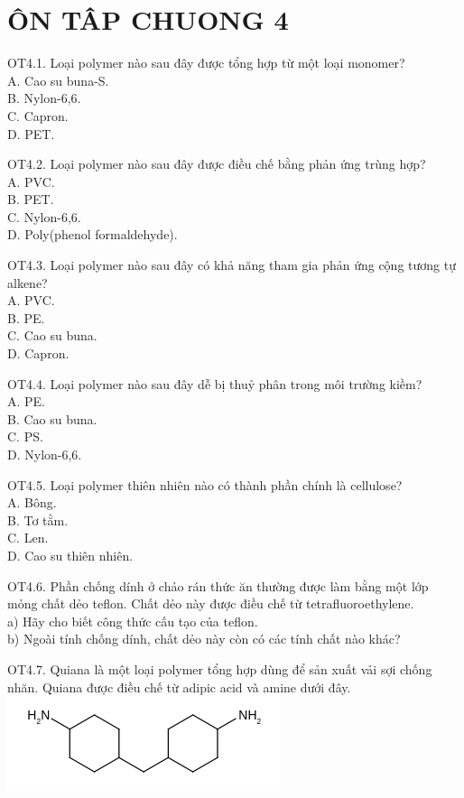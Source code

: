 \documentclass[10pt]{article}
\begin{document}
\section*{ÔN TÂP CHUONG 4}
OT4.1. Loại polymer nào sau đây được tổng hợp từ một loại monomer?\\
A. Cao su buna-S.\\
B. Nylon-6,6.\\
C. Capron.\\
D. PET.

OT4.2. Loại polymer nào sau đây được điều chế bằng phản ứng trùng hợp?\\
A. PVC.\\
B. PET.\\
C. Nylon-6,6.\\
D. Poly(phenol formaldehyde).

OT4.3. Loại polymer nào sau đây có khả năng tham gia phản ứng cộng tương tự alkene?\\
A. PVC.\\
B. PE.\\
C. Cao su buna.\\
D. Capron.

OT4.4. Loại polymer nào sau đây dễ bị thuỷ phân trong môi trường kiềm?\\
A. PE.\\
B. Cao su buna.\\
C. PS.\\
D. Nylon-6,6.

OT4.5. Loại polymer thiên nhiên nào có thành phần chính là cellulose?\\
A. Bông.\\
B. Tơ tằm.\\
C. Len.\\
D. Cao su thiên nhiên.

OT4.6. Phần chống dính ở chảo rán thức ăn thường được làm bằng một lớp mỏng chất dẻo teflon. Chất dẻo này được điều chế từ tetrafluoroethylene.\\
a) Hãy cho biết công thức cấu tạo của teflon.\\
b) Ngoài tính chống dính, chất dẻo này còn có các tính chất nào khác?

OT4.7. Quiana là một loại polymer tổng hợp dùng để sản xuất vải sợi chống nhăn. Quiana được điều chế từ adipic acid và amine dưới đây.\\
\includegraphics{smile-8f75da9107b8edce38ffabee1fdb784a5c804cf5}
\end{document}
